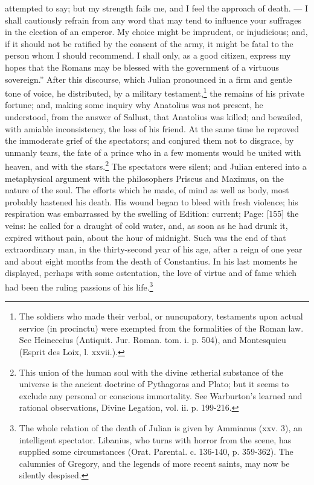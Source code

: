 attempted to say; but my strength fails me, and I feel the approach of death. \texthebrew{—} I shall cautiously refrain from any word that may tend to influence your suffrages in the election of an emperor. My choice might be imprudent, or injudicious; and, if it should not be ratified by the consent of the army, it might be fatal to the person whom I should recommend. I shall only, as a good citizen, express my hopes that the Romans may be blessed with the government of a virtuous sovereign.\texthebrew{}” After this discourse, which Julian pronounced in a firm and gentle tone of voice, he distributed, by a military testament,\footnote{The soldiers who made their verbal, or nuncupatory, testaments upon actual service (in procinctu) were exempted from the formalities of the Roman law. See Heineccius (Antiquit. Jur. Roman. tom. i. p. 504), and Montesquieu (Esprit des Loix, l. xxvii.).} the remains of his private fortune; and, making some inquiry why Anatolius was not present, he understood, from the answer of Sallust, that Anatolius was killed; and bewailed, with amiable inconsistency, the loss of his friend. At the same time he reproved the immoderate grief of the spectators; and conjured them not to disgrace, by unmanly tears, the fate of a prince who in a few moments would be united with heaven, and with the stars.\footnote{This union of the human soul with the divine ætherial substance of the universe is the ancient doctrine of Pythagoras and Plato; but it seems to exclude any personal or conscious immortality. See Warburton\texthebrew{}’s learned and rational observations, Divine Legation, vol. ii. p. 199-216.} The spectators were silent; and Julian entered into a metaphysical argument with the philosophers Priscus and Maximus, on the nature of the soul. The efforts which he made, of mind as well as body, most probably hastened his death. His wound began to bleed with fresh violence; his respiration was embarrassed by the swelling of Edition: current; Page: [155] the veins: he called for a draught of cold water, and, as soon as he had drunk it, expired without pain, about the hour of midnight. Such was the end of that extraordinary man, in the thirty-second year of his age, after a reign of one year and about eight months from the death of Constantius. In his last moments he displayed, perhaps with some ostentation, the love of virtue and of fame which had been the ruling passions of his life.\footnote{The whole relation of the death of Julian is given by Ammianus (xxv. 3), an intelligent spectator. Libanius, who turns with horror from the scene, has supplied some circumstances (Orat. Parental. c. 136-140, p. 359-362). The calumnies of Gregory, and the legends of more recent saints, may now be silently despised.}

